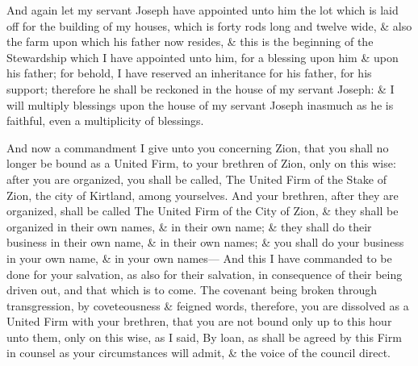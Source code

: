 					And again let my servant Joseph have appointed unto him the lot which is laid off for the building of my houses, which is forty rods long and twelve wide, \& also the farm upon which his father now resides, \& this is the beginning of the Stewardship which I have appointed unto him, for a blessing upon him \& upon his father; for behold, I have reserved an inheritance for his father, for his support; therefore he shall be reckoned in the house of my servant Joseph: \& I will multiply blessings upon the house of my servant Joseph inasmuch as he is faithful, even a multiplicity of blessings.

					And now a commandment I give unto you concerning Zion, that you shall no longer be bound as a United Firm, to your brethren of Zion, only on this wise: after you are organized, you shall be called, The United Firm of the Stake of Zion, the city of Kirtland, among yourselves. And your brethren, after they are organized, shall be called The United Firm of the City of Zion, \& they shall be organized in their own names, \& in their own name; \& they shall do their business in their own name, \& in their own names; \& you shall do your business in your own name, \& in your own names--- And this I have commanded to be done for your salvation, as also for their salvation, in consequence of their being driven out, and that which is to come. The covenant being broken through transgression, by coveteousness \& feigned words, therefore, you are dissolved as a United Firm with your brethren, that you are not bound only up to this hour unto them, only on this wise, as I said, By loan, as shall be agreed by this Firm in counsel as your circumstances will admit, \& the voice of the council direct.

